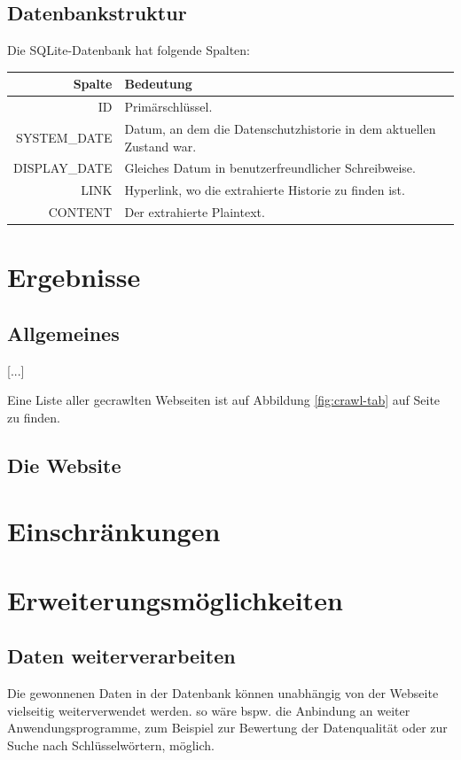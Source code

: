 \documentclass{article}
\begin{document}
	\subsection{Datenbankstruktur}
		Die SQLite-Datenbank hat folgende Spalten:
		
		\begin{tabularx}{\textwidth}{|r|X|}
			\hline
			\textbf{Spalte} & \textbf{Bedeutung} \\ \hline \hline
			ID & Primärschlüssel. \\ \hline
			SYSTEM\_DATE & Datum, an dem die Datenschutzhistorie in dem aktuellen Zustand war.\\ \hline
			DISPLAY\_DATE & Gleiches Datum in benutzerfreundlicher Schreibweise. \\ \hline
			LINK & Hyperlink, wo die extrahierte Historie zu finden ist.\\ \hline
			CONTENT & Der extrahierte Plaintext.\\ \hline
		\end{tabularx}
	
	
	\section{Ergebnisse} 
	\subsection{Allgemeines}
	[...]
	
	Eine Liste aller gecrawlten Webseiten ist auf Abbildung \ref{fig:crawl-tab} auf Seite \pageref{fig:crawl-tab} zu finden.
	\subsection{Die Website}
	
	\section{Einschränkungen}
	
	\section{Erweiterungsmöglichkeiten}
	\subsection{Daten weiterverarbeiten}
	Die gewonnenen Daten in der Datenbank können unabhängig von der Webseite vielseitig weiterverwendet werden. so wäre bspw. die Anbindung an weiter Anwendungsprogramme, zum Beispiel zur Bewertung der Datenqualität oder zur Suche nach Schlüsselwörtern, möglich.
\end{document}
